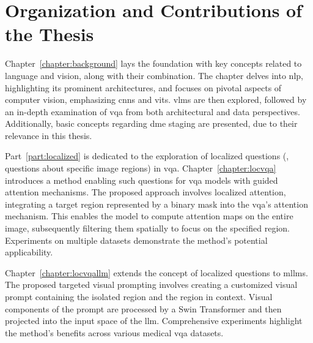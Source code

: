


\section{Organization and Contributions of the Thesis}


Chapter~\ref{chapter:background} lays the foundation with key concepts related to language and vision, along with their combination. The chapter delves into \gls{nlp}, highlighting its prominent architectures, and focuses on pivotal aspects of computer vision, emphasizing \glspl{cnn} and \glspl{vit}. \glspl{vlm} are then explored, followed by an in-depth examination of \gls{vqa} from both architectural and data perspectives. Additionally, basic concepts regarding \gls{dme} staging are presented, due to their relevance in this thesis.

Part~\ref{part:localized} is dedicated to the exploration of localized questions (\ie, questions about specific image regions) in \gls{vqa}. Chapter~\ref{chapter:locvqa} introduces a method enabling such questions for \gls{vqa} models with guided attention mechanisms. The proposed approach involves localized attention, integrating a target region represented by a binary mask into the \gls{vqa}'s attention mechanism. This enables the model to compute attention maps on the entire image, subsequently filtering them spatially to focus on the specified region. Experiments on multiple datasets demonstrate the method's potential applicability.

Chapter~\ref{chapter:locvqallm} extends the concept of localized questions to \glspl{mllm}. The proposed targeted visual prompting involves creating a customized visual prompt containing the isolated region and the region in context. Visual components of the prompt are processed by a Swin Transformer and then projected into the input space of the \gls{llm}. Comprehensive experiments highlight the method's benefits across various medical \gls{vqa} datasets. 

